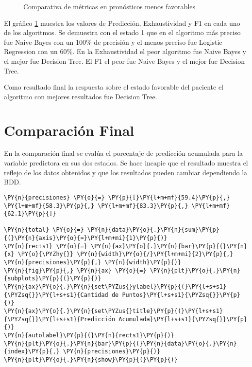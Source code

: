 \begin{center}
    	\begin{figure}[H]
	\centering
	\caption{Comparativa de métricas en pronósticos menos favorables}
	\label{fig:cmpmf}
	\end{figure}
\end{center}
    
    El gráfico \ref{fig:cmpmf} muestra los valores de Predicción, Exhaustividad y F1 en cada
uno de los algoritmos. Se demuestra con el estado 1 que en el algoritmo
más preciso fue Naive Bayes con un 100\% de precisión y el menos preciso
fue Logistic Regression con un 60\%. En la Exhaustividad el peor
algoritmo fue Naive Bayes y el mejor fue Decision Tree. El F1 el peor
fue Naive Bayes y el mejor fue Decision Tree.

    Como resultado final la respuesta sobre el estado favorable del paciente
el algoritmo con mejores resultados fue Decision Tree.

    \hypertarget{comparaciuxf3n-final}{%
\section{Comparación Final}\label{comparaciuxf3n-final}}

En la comparación final se evalúa el porcentaje de predicción acumulada
para la variable predictora en sus dos estados. Se hace incapie que el
resultado muestra el reflejo de los datos obtenidos y que los resultados
pueden cambiar dependiendo la BDD.

    \begin{tcolorbox}[breakable, size=fbox, boxrule=1pt, pad at break*=1mm,colback=cellbackground, colframe=cellborder]
\begin{Verbatim}[commandchars=\\\{\}]
\PY{n}{precisiones} \PY{o}{=} \PY{p}{[}\PY{l+m+mf}{59.4}\PY{p}{,} \PY{l+m+mf}{58.3}\PY{p}{,} \PY{l+m+mf}{83.3}\PY{p}{,} \PY{l+m+mf}{62.1}\PY{p}{]}

\PY{n}{total} \PY{o}{=} \PY{n}{data}\PY{o}{.}\PY{n}{sum}\PY{p}{(}\PY{n}{axis}\PY{o}{=}\PY{l+m+mi}{1}\PY{p}{)}
\PY{n}{rects1} \PY{o}{=} \PY{n}{ax}\PY{o}{.}\PY{n}{bar}\PY{p}{(}\PY{n}{x} \PY{o}{\PYZhy{}} \PY{n}{width}\PY{o}{/}\PY{l+m+mi}{2}\PY{p}{,} \PY{n}{precisiones}\PY{p}{,} \PY{n}{width}\PY{p}{)}
\PY{n}{fig}\PY{p}{,} \PY{n}{ax} \PY{o}{=} \PY{n}{plt}\PY{o}{.}\PY{n}{subplots}\PY{p}{(}\PY{p}{)}
\PY{n}{ax}\PY{o}{.}\PY{n}{set\PYZus{}ylabel}\PY{p}{(}\PY{l+s+s1}{\PYZsq{}}\PY{l+s+s1}{Cantidad de Puntos}\PY{l+s+s1}{\PYZsq{}}\PY{p}{)}
\PY{n}{ax}\PY{o}{.}\PY{n}{set\PYZus{}title}\PY{p}{(}\PY{l+s+s1}{\PYZsq{}}\PY{l+s+s1}{Predicción Acumulada}\PY{l+s+s1}{\PYZsq{}}\PY{p}{)}
\PY{n}{autolabel}\PY{p}{(}\PY{n}{rects1}\PY{p}{)}
\PY{n}{plt}\PY{o}{.}\PY{n}{bar}\PY{p}{(}\PY{n}{data}\PY{o}{.}\PY{n}{index}\PY{p}{,} \PY{n}{precisiones}\PY{p}{)}
\PY{n}{plt}\PY{o}{.}\PY{n}{show}\PY{p}{(}\PY{p}{)}
\end{Verbatim}
\end{tcolorbox}

